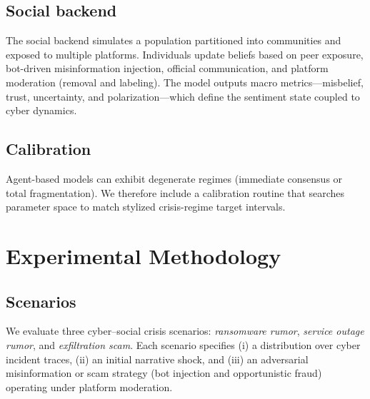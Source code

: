 \documentclass[biomimetics,article,submit,pdftex,moreauthors]{Definitions/mdpi}
\begin{document}
\subsection{Social backend}
The social backend simulates a population partitioned into communities and exposed to multiple platforms. Individuals update beliefs based on peer exposure, bot-driven misinformation injection, official communication, and platform moderation (removal and labeling). The model outputs macro metrics---misbelief, trust, uncertainty, and polarization---which define the sentiment state coupled to cyber dynamics.

\subsection{Calibration}
Agent-based models can exhibit degenerate regimes (immediate consensus or total fragmentation). We therefore include a calibration routine that searches parameter space to match stylized crisis-regime target intervals. 

\section{Experimental Methodology}
\label{sec:method}

\subsection{Scenarios}
We evaluate three cyber--social crisis scenarios: \textit{ransomware rumor}, \textit{service outage rumor}, and \textit{exfiltration scam}.
Each scenario specifies (i) a distribution over cyber incident traces, (ii) an initial narrative shock, and (iii) an adversarial misinformation or scam strategy (bot injection and opportunistic fraud) operating under platform moderation.
\end{document}
